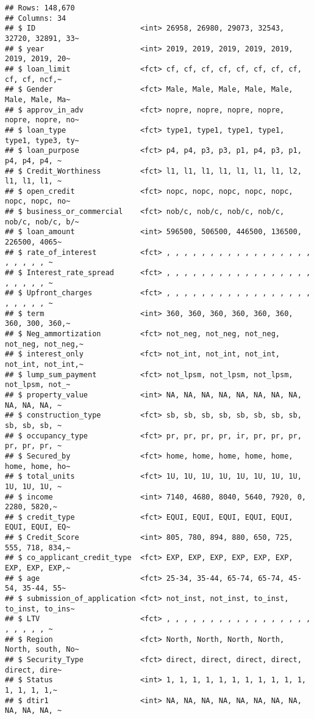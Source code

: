 \documentclass[
]{article}
\begin{document}
\begin{verbatim}
## Rows: 148,670
## Columns: 34
## $ ID                        <int> 26958, 26980, 29073, 32543, 32720, 32891, 33~
## $ year                      <int> 2019, 2019, 2019, 2019, 2019, 2019, 2019, 20~
## $ loan_limit                <fct> cf, cf, cf, cf, cf, cf, cf, cf, cf, cf, ncf,~
## $ Gender                    <fct> Male, Male, Male, Male, Male, Male, Male, Ma~
## $ approv_in_adv             <fct> nopre, nopre, nopre, nopre, nopre, nopre, no~
## $ loan_type                 <fct> type1, type1, type1, type1, type1, type3, ty~
## $ loan_purpose              <fct> p4, p4, p3, p3, p1, p4, p3, p1, p4, p4, p4, ~
## $ Credit_Worthiness         <fct> l1, l1, l1, l1, l1, l1, l1, l2, l1, l1, l1, ~
## $ open_credit               <fct> nopc, nopc, nopc, nopc, nopc, nopc, nopc, no~
## $ business_or_commercial    <fct> nob/c, nob/c, nob/c, nob/c, nob/c, nob/c, b/~
## $ loan_amount               <int> 596500, 506500, 446500, 136500, 226500, 4065~
## $ rate_of_interest          <fct> , , , , , , , , , , , , , , , , , , , , , , ~
## $ Interest_rate_spread      <fct> , , , , , , , , , , , , , , , , , , , , , , ~
## $ Upfront_charges           <fct> , , , , , , , , , , , , , , , , , , , , , , ~
## $ term                      <int> 360, 360, 360, 360, 360, 360, 360, 300, 360,~
## $ Neg_ammortization         <fct> not_neg, not_neg, not_neg, not_neg, not_neg,~
## $ interest_only             <fct> not_int, not_int, not_int, not_int, not_int,~
## $ lump_sum_payment          <fct> not_lpsm, not_lpsm, not_lpsm, not_lpsm, not_~
## $ property_value            <int> NA, NA, NA, NA, NA, NA, NA, NA, NA, NA, NA, ~
## $ construction_type         <fct> sb, sb, sb, sb, sb, sb, sb, sb, sb, sb, sb, ~
## $ occupancy_type            <fct> pr, pr, pr, pr, ir, pr, pr, pr, pr, pr, pr, ~
## $ Secured_by                <fct> home, home, home, home, home, home, home, ho~
## $ total_units               <fct> 1U, 1U, 1U, 1U, 1U, 1U, 1U, 1U, 1U, 1U, 1U, ~
## $ income                    <int> 7140, 4680, 8040, 5640, 7920, 0, 2280, 5820,~
## $ credit_type               <fct> EQUI, EQUI, EQUI, EQUI, EQUI, EQUI, EQUI, EQ~
## $ Credit_Score              <int> 805, 780, 894, 880, 650, 725, 555, 718, 834,~
## $ co_applicant_credit_type  <fct> EXP, EXP, EXP, EXP, EXP, EXP, EXP, EXP, EXP,~
## $ age                       <fct> 25-34, 35-44, 65-74, 65-74, 45-54, 35-44, 55~
## $ submission_of_application <fct> not_inst, not_inst, to_inst, to_inst, to_ins~
## $ LTV                       <fct> , , , , , , , , , , , , , , , , , , , , , , ~
## $ Region                    <fct> North, North, North, North, North, south, No~
## $ Security_Type             <fct> direct, direct, direct, direct, direct, dire~
## $ Status                    <int> 1, 1, 1, 1, 1, 1, 1, 1, 1, 1, 1, 1, 1, 1, 1,~
## $ dtir1                     <int> NA, NA, NA, NA, NA, NA, NA, NA, NA, NA, NA, ~
\end{verbatim}
\end{document}
